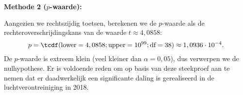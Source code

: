 {    {\bfseries Methode 2 ($p$-waarde):} 

    Aangezien we rechtszijdig toetsen, berekenen we de $p$-waarde als de rechteroverschrijdingskans van de waarde $t \approx 4,0858$:
    \begin{align*}
        p = \tcdf(\text{lower}=4,0858; \text{upper}=10^{99}; \text{df}=38) \approx 1,0936 \cdot 10^{-4}.
    \end{align*}
    De $p$-waarde is extreem klein (veel kleiner dan $\alpha=0,05$), dus verwerpen we de nulhypothese.
    Er is voldoende reden om op basis van deze steekproef aan te nemen dat er daadwerkelijk een significante daling is gerealiseerd in de luchtverontreiniging in 2018.
}